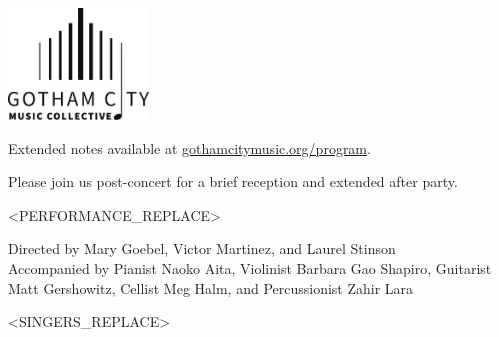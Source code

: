 \documentclass{article}[10pt]
\newcommand{\logo}{
        {\includegraphics[width=0.28\textwidth]{../graphic_design_assets/bw_logo_full}}
}
\newcommand{\tunedspacesmall}{\vspace{0.09in}}
\begin{document}
    \begin{center}

        \logo

        \tunedspacesmall


        {\footnotesize\textbf{}}

        \tunedspacesmall

        {
            \footnotesize{
                Extended notes available at
                \href{https://gothamcitymusic.org/program}{gothamcitymusic.org/program}.

                Please join us post-concert for a brief reception and extended after party.
            }
        }

        \tunedspacesmall
        \tunedspacesmall

        \begin{minipage}{\textwidth}
            \begin{flushright}

                <PERFORMANCE_REPLACE>

            \end{flushright}
        \end{minipage}

        \tunedspacesmall
        \tunedspacesmall

        {
            \textbf{}


            \begin{small}
                Directed by
                Mary Goebel,
                Victor Martinez,
                and
                Laurel Stinson\\
                Accompanied by Pianist Naoko Aita, Violinist Barbara Gao Shapiro, Guitarist Matt Gershowitz, Cellist Meg Halm, and Percussionist Zahir Lara

            \end{small}

            \vspace{-0.1in}

            \begin{multicols*}{3}
                \begin{center}
                    \begin{small}
                        <SINGERS_REPLACE>
                    \end{small}
                \end{center}
            \end{multicols*}
        }
    \end{center}
\end{document}

